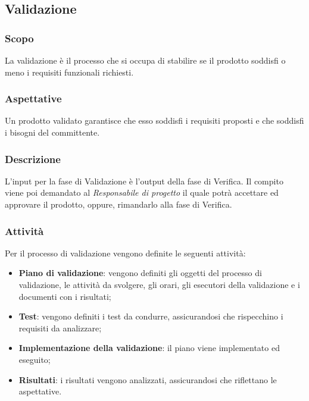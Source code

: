 	\subsection{Validazione}

	\subsubsection{Scopo}
	La validazione è il processo che si occupa di stabilire se il prodotto soddisfi o meno i requisiti funzionali richiesti. 
	
	\subsubsection{Aspettative}
		Un prodotto validato garantisce che esso soddisfi i requisiti proposti e che soddisfi i bisogni del committente.
	
	\subsubsection{Descrizione}
	L'input per la fase di Validazione è l'output della fase di Verifica. Il compito viene poi demandato al \textit{Responsabile di progetto} il quale potrà accettare ed approvare il prodotto, oppure, rimandarlo alla fase di Verifica.
	\subsubsection{Attività}
	Per il processo di validazione vengono definite le seguenti attività:
	\begin{itemize}
	    \item \textbf{Piano di validazione}: vengono definiti gli oggetti del processo di validazione, le attività da svolgere, gli orari, gli esecutori della validazione e i documenti con i risultati;
	    \item \textbf{Test}: vengono definiti i test da condurre, assicurandosi che rispecchino i requisiti da analizzare;
	    \item \textbf{Implementazione della validazione}: il piano viene implementato ed eseguito;
	    \item \textbf{Risultati}: i risultati vengono analizzati, assicurandosi che riflettano le aspettative.
	\end{itemize}
	
